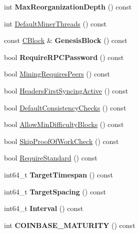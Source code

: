 \begin{DoxyCompactItemize}
int {\bfseries Max\+Reorganization\+Depth} () const
\item 
int \mbox{\hyperlink{class_c_chain_params_ac2da912493292c2139ca7753dde96b2e}{Default\+Miner\+Threads}} () const
\item 
\mbox{\label{class_c_chain_params_aebd6cb9d986eeb2e6c228c04b3c39b42}} 
const \mbox{\hyperlink{class_c_block}{C\+Block}} \& {\bfseries Genesis\+Block} () const
\item 
\mbox{\label{class_c_chain_params_af5cd19bae91d97cd28152dac47f29190}} 
bool {\bfseries Require\+R\+P\+C\+Password} () const
\item 
bool \mbox{\hyperlink{class_c_chain_params_a066ad4166984a31bdc0836193a6341ee}{Mining\+Requires\+Peers}} () const
\item 
bool \mbox{\hyperlink{class_c_chain_params_ae1bf9eed6ce76328909127bfc9965f76}{Headers\+First\+Syncing\+Active}} () const
\item 
bool \mbox{\hyperlink{class_c_chain_params_a1d12f9b4b1ea7d7a0416cb6045496342}{Default\+Consistency\+Checks}} () const
\item 
bool \mbox{\hyperlink{class_c_chain_params_ac1202f87305ff3fdd4e1da28f1b35218}{Allow\+Min\+Difficulty\+Blocks}} () const
\item 
bool \mbox{\hyperlink{class_c_chain_params_a79b6cb67af99906669f7219a14a83cf7}{Skip\+Proof\+Of\+Work\+Check}} () const
\item 
bool \mbox{\hyperlink{class_c_chain_params_a30c1b60e515537b01810e175844d852f}{Require\+Standard}} () const
\item 
\mbox{\label{class_c_chain_params_a31aee5a207f45026c08cc37f3a0f7b89}} 
int64\+\_\+t {\bfseries Target\+Timespan} () const
\item 
\mbox{\label{class_c_chain_params_a9c039f77ecdc58117dca0c6a5bae0dff}} 
int64\+\_\+t {\bfseries Target\+Spacing} () const
\item 
\mbox{\label{class_c_chain_params_aaf86b1e5312dea14645af764fc41be7f}} 
int64\+\_\+t {\bfseries Interval} () const
\item 
\mbox{\label{class_c_chain_params_ab752b3ae1230aaf40b5a2d14d628fab7}} 
int {\bfseries C\+O\+I\+N\+B\+A\+S\+E\+\_\+\+M\+A\+T\+U\+R\+I\+TY} () const

\end{DoxyCompactItemize}
